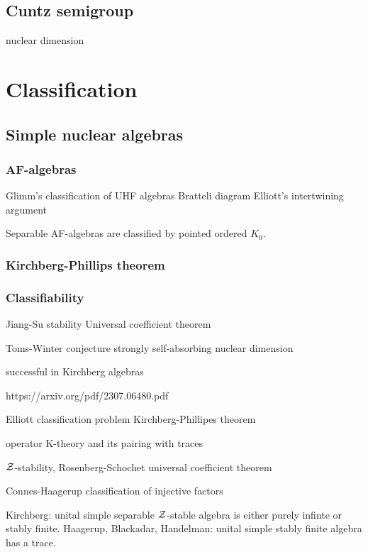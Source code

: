 \documentclass{../../large}
\begin{document}
\chapter{Cuntz semigroup}

nuclear dimension










\part{Classification}
\chapter{Simple nuclear algebras}


\section{AF-algebras}

Glimm's classification of UHF algebras
Bratteli diagram
Elliott's intertwining argument

Separable AF-algebras are classified by pointed ordered $K_0$.


\section{Kirchberg-Phillips theorem}

\section{Classifiability}
Jiang-Su stability
Universal coefficient theorem

Toms-Winter conjecture
strongly self-absorbing
nuclear dimension




successful in Kirchberg algebras


https://arxiv.org/pdf/2307.06480.pdf

Elliott classification problem
Kirchberg-Phillipes theorem

operator K-theory and its pairing with traces

$\mathcal{Z}$-stability, Rosenberg-Schochet universal coefficient theorem

Connes-Haagerup classification of injective factors

Kirchberg: unital simple separable $\mathcal{Z}$-stable algebra is either purely infinte or stably finite.
Haagerup, Blackadar, Handelman: unital simple stably finite algebra has a trace.
\end{document}
